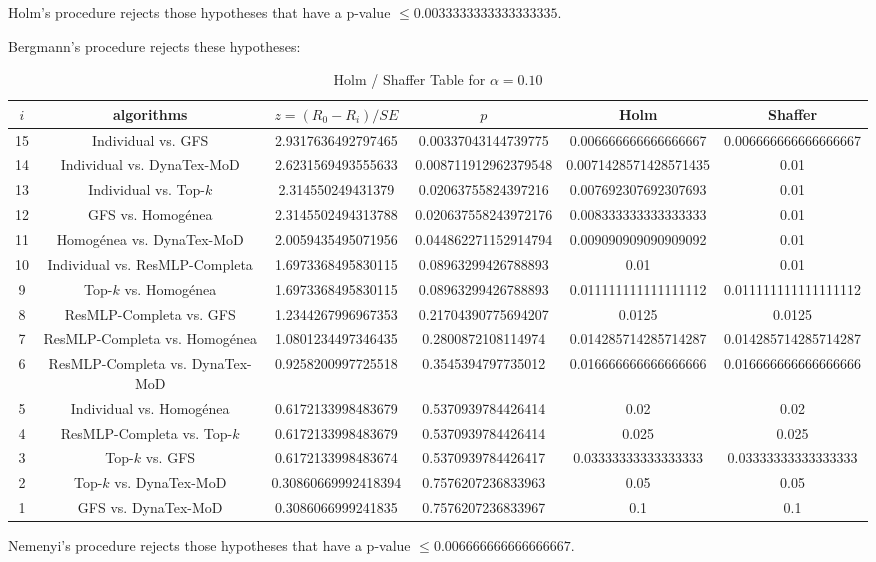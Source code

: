 \documentclass[a4paper,10pt]{article}
\begin{document}
\begin{landscape}
Holm's procedure rejects those hypotheses that have a p-value $\le0.0033333333333333335$.


Bergmann's procedure rejects these hypotheses:


\begin{itemize}


\end{itemize}


\begin{table}[!htp]
\centering\tiny
\caption{Holm / Shaffer Table for $\alpha=0.10$}
\begin{tabular}{cccccc}
$i$&algorithms&$z=(R_0 - R_i)/SE$&$p$&Holm&Shaffer\\
\hline
15&Individual vs. GFS&2.9317636492797465&0.00337043144739775&0.006666666666666667&0.006666666666666667\\
14&Individual vs. DynaTex-MoD&2.6231569493555633&0.008711912962379548&0.0071428571428571435&0.01\\
13&Individual vs. Top-$k$&2.314550249431379&0.02063755824397216&0.007692307692307693&0.01\\
12&GFS vs. Homogénea&2.3145502494313788&0.020637558243972176&0.008333333333333333&0.01\\
11&Homogénea vs. DynaTex-MoD&2.0059435495071956&0.044862271152914794&0.009090909090909092&0.01\\
10&Individual vs. ResMLP-Completa&1.6973368495830115&0.08963299426788893&0.01&0.01\\
9&Top-$k$ vs. Homogénea&1.6973368495830115&0.08963299426788893&0.011111111111111112&0.011111111111111112\\
8&ResMLP-Completa vs. GFS&1.2344267996967353&0.21704390775694207&0.0125&0.0125\\
7&ResMLP-Completa vs. Homogénea&1.0801234497346435&0.2800872108114974&0.014285714285714287&0.014285714285714287\\
6&ResMLP-Completa vs. DynaTex-MoD&0.9258200997725518&0.3545394797735012&0.016666666666666666&0.016666666666666666\\
5&Individual vs. Homogénea&0.6172133998483679&0.5370939784426414&0.02&0.02\\
4&ResMLP-Completa vs. Top-$k$&0.6172133998483679&0.5370939784426414&0.025&0.025\\
3&Top-$k$ vs. GFS&0.6172133998483674&0.5370939784426417&0.03333333333333333&0.03333333333333333\\
2&Top-$k$ vs. DynaTex-MoD&0.30860669992418394&0.7576207236833963&0.05&0.05\\
1&GFS vs. DynaTex-MoD&0.3086066999241835&0.7576207236833967&0.1&0.1\\
\hline
\end{tabular}
\end{table}
Nemenyi's procedure rejects those hypotheses that have a p-value $\le0.006666666666666667$.



\end{landscape}
\end{document}

